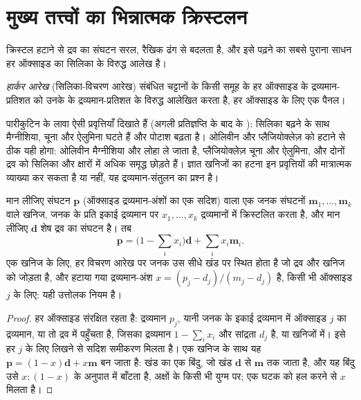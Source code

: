 \section{मुख्य तत्त्वों का भिन्नात्मक क्रिस्टलन}\label{sec:b2:magmatic-differentiation:majors}

क्रिस्टल हटाने से द्रव का संघटन सरल, रैखिक ढंग से बदलता है,
और इसे पढ़ने का सबसे पुराना साधन हर ऑक्साइड का सिलिका के विरुद्ध आलेख है।

\begin{definition}[हार्कर आरेख]\label{def:b2:magmatic-differentiation:harker}
\emph{हार्कर आरेख} (सिलिका-विचरण आरेख) संबंधित चट्टानों के किसी समूह के
हर ऑक्साइड के द्रव्यमान-प्रतिशत को उनके  के द्रव्यमान-प्रतिशत के विरुद्ध
आलेखित करता है, हर ऑक्साइड के लिए एक पैनल।
\end{definition}


पारीकुटिन के लावा ऐसी प्रवृत्तियाँ दिखाते हैं (अगली प्रतिज्ञप्ति के बाद के ):
सिलिका बढ़ने के साथ मैग्नीशिया, चूना और ऐलुमिना घटते हैं और पोटाश बढ़ता है। ओलिवीन और
प्लैजियोक्लेज़ को हटाने से ठीक यही होगा:
ओलिवीन मैग्नीशिया और लोहा ले जाता है, प्लैजियोक्लेज़ चूना और ऐलुमिना, और दोनों
द्रव को सिलिका और क्षारों में अधिक समृद्ध छोड़ते हैं। ज्ञात खनिजों का हटना इन प्रवृत्तियों की
मात्रात्मक व्याख्या कर सकता है या नहीं, यह द्रव्यमान-संतुलन का प्रश्न है।

\begin{proposition}[क्रिस्टल हटाने का द्रव्यमान-संतुलन]\label{prop:b2:magmatic-differentiation:lever}
मान लीजिए संघटन $\mathbf p$ (ऑक्साइड द्रव्यमान-अंशों का एक सदिश) वाला एक जनक 
संघटनों $\mathbf m_1, \dots, \mathbf m_k$ वाले खनिज, जनक के प्रति इकाई द्रव्यमान पर
$x_1, \dots, x_k$ द्रव्यमानों में क्रिस्टलित करता है, और मान लीजिए $\mathbf d$ शेष
द्रव का संघटन है। तब
\[
\mathbf p = \Big(1 - \sum_i x_i\Big)\mathbf d + \sum_i x_i \mathbf m_i .
\]
एक खनिज के लिए, हर विचरण आरेख पर जनक उस सीधे खंड पर स्थित होता है जो द्रव और
खनिज को जोड़ता है, और हटाया गया द्रव्यमान-अंश
$x = (p_j - d_j)/(m_j - d_j)$ है, किसी भी ऑक्साइड $j$ के लिए: यही उत्तोलक नियम है।
\end{proposition}

\begin{proof}
हर ऑक्साइड संरक्षित रहता है: द्रव्यमान $p_j$, यानी जनक के इकाई द्रव्यमान में ऑक्साइड $j$ का द्रव्यमान,
या तो द्रव में पहुँचता है, जिसका द्रव्यमान $1 - \sum_i x_i$ और सांद्रता $d_j$ है, या
खनिजों में। इसे हर $j$ के लिए लिखने से सदिश समीकरण मिलता है। एक खनिज के साथ यह
$\mathbf p = (1-x)\mathbf d + x\mathbf m$ बन जाता है: खंड का एक बिंदु, जो खंड
$\mathbf d$ से $\mathbf m$ तक जाता है, और यह बिंदु उसे $x : (1-x)$ के अनुपात में बाँटता है, अक्षों के
किसी भी युग्म पर; एक घटक को हल करने से $x$ मिलता है।
\end{proof}

